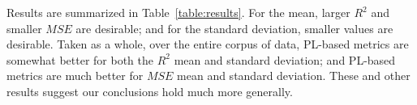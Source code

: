 Results are summarized in Table~\ref{table:results}.
For the mean, larger $R^{2}$ and smaller $MSE$ are desirable; and for the standard deviation, smaller values are desirable.
Taken as a whole, over the entire corpus of data, PL-based metrics are somewhat better for both the $R^{2}$ mean and standard deviation;
and PL-based metrics are much better for $MSE$ mean and standard deviation.
These and other results suggest our conclusions hold much more generally.


